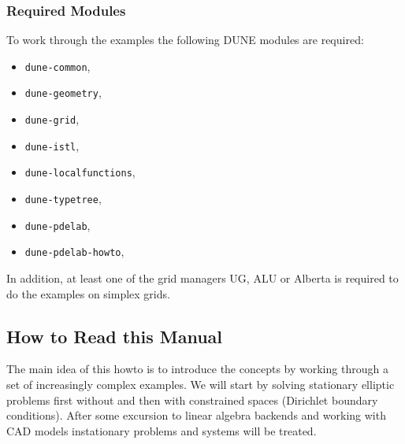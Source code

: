 \begin{frame}
\frametitle<presentation>{Required Modules}
To work through the examples the following DUNE modules are required: 
\begin{itemize}
\item \lstinline{dune-common},
\item \lstinline{dune-geometry},
\item \lstinline{dune-grid},
\item \lstinline{dune-istl},
\item \lstinline{dune-localfunctions},
\item \lstinline{dune-typetree},
\item \lstinline{dune-pdelab},
\item \lstinline{dune-pdelab-howto},
\end{itemize}

In addition, at least one of the grid managers UG, ALU or Alberta is
required to do the examples on simplex grids. 
\end{frame}



\subsection<article>{How to Read this Manual}

The main idea of this howto is to introduce the concepts by working
through a set of increasingly complex examples. We will start by 
solving stationary elliptic problems first without and then with constrained spaces
(Dirichlet boundary conditions). After some excursion to linear algebra backends and 
working with CAD models instationary problems and systems will be treated.

\cleardoublepage
